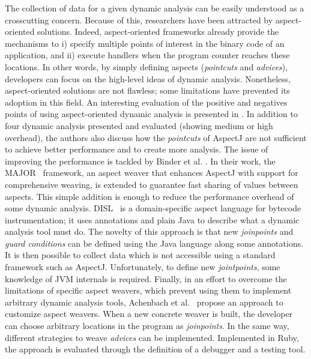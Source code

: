 The collection of data for a given dynamic analysis can be easily understood as a crosscutting concern.
Because of this, researchers have been attracted by aspect-oriented solutions.
Indeed, aspect-oriented frameworks already provide the mechanisms to i) specify multiple points of interest in the binary code of an application, and ii) execute handlers when the program counter reaches these locations.
In other words, by simply defining aspects (\textit{pointcuts} and \textit{advices}), developers can focus on the high-level ideas of dynamic analysis.
Nonetheless, aspect-oriented solutions are not flawless; some limitations have prevented its adoption in this field.
An interesting evaluation of the positive and negatives points of using aspect-oriented dynamic analysis is presented in \cite{Pearce:2007:PA:1248445.1248448}.
In addition to four dynamic analysis presented and evaluated (showing medium or high overhead), the authors also discuss how the \textit{pointcuts} of AspectJ are not sufficient to achieve better performance and to create more analysis.
The issue of improving the performance is tackled by Binder et al. \cite{Binder:2006:FEM:1173706.1173733}.
In their work, the MAJOR~\cite{Villazon20111015} framework, an aspect weaver that enhances AspectJ with support for comprehensive weaving, is extended to guarantee fast sharing of values between aspects.
This simple addition is enough to reduce the performance overhead of some dynamic analysis.
DISL~\cite{Marek:2012:DEL:2162037.2162046,Marek2012} is a domain-specific aspect language for bytecode instrumentation; it uses annotations and plain Java to describe what a dynamic analysis tool must do.
The novelty of this approach is that new \textit{joinpoints} and \textit{guard conditions} can be defined using the Java language along some annotations.
It is then possible to collect data which is not accessible using a standard framework such as AspectJ.
Unfortunately, to define new \textit{jointpoints}, some knowledge of JVM internals is required.
Finally, in an effort to overcome the limitations of specific aspect weavers, which prevent using them to implement arbitrary dynamic analysis tools, Achenbach et al.~\cite{Achenbach:2010:MPD:1939399.1939415} propose an approach to customize aspect weavers.
When a new concrete weaver is built, the developer can choose arbitrary locations in the program as \textit{joinpoints}.
In the same way, different strategies to weave \textit{advices} can be implemented.
Implemented in Ruby, the approach is evaluated through the definition of a debugger and a testing tool.

